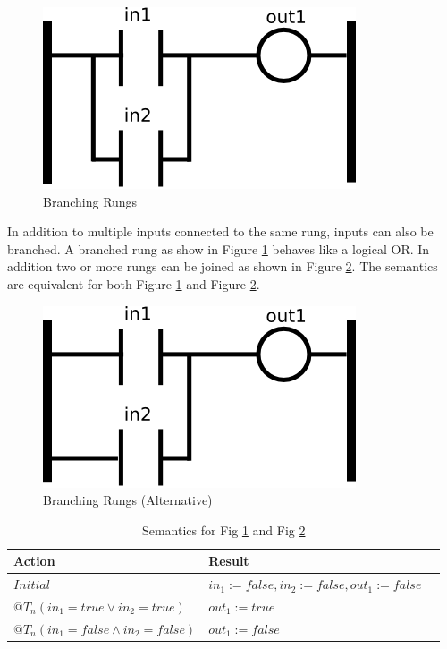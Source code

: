 \begin{figure}[h]
    \centering
    \includegraphics[width=\imgsmall]{./images/intro_fig3.png}
    \caption{Branching Rungs}
    \label{fig:intro_fig3}
\end{figure}


In addition to multiple inputs connected to the same rung, inputs can also be branched. A branched rung as
show in Figure \ref{fig:intro_fig3} behaves like a logical OR. In addition two or more rungs can be joined
as shown in Figure \ref{fig:intro_fig3a}. The semantics are equivalent for both Figure \ref{fig:intro_fig3} and Figure \ref{fig:intro_fig3a}.

\begin{figure}[h]
    \centering
    \includegraphics[width=\imgsmall]{./images/intro_fig3a.png}
    \caption{Branching Rungs (Alternative)}
    \label{fig:intro_fig3a}
\end{figure}

\begin{table}[h]
    \centering
       \begin{tabular}{|l|l|l|}
        \hline
        Action & Result \\
        \hline
        $Initial$ & $in_1 := false, in_2 := false, out_1 := false$\\
        \hline
        $@T_n(in_1 = true \vee in_2 = true)$ & $out_1 := true$ \\
        \hline
        $@T_n(in_1 = false \wedge in_2 = false)$ & $out_1 := false$\\
        \hline
    \end{tabular}
    \caption{Semantics for Fig \ref{fig:intro_fig3} and Fig \ref{fig:intro_fig3a}}
    \label{table:table_for_fig3}
\end{table}

